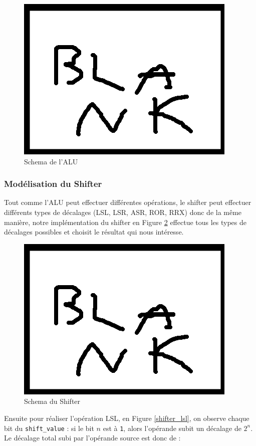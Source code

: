 \documentclass{article}
\begin{document}
\begin{figure}[ht]
\includegraphics[scale=1]{pics/blank.png}
\centering
\caption{Schema de l'ALU}
\label{alu}
\end{figure}

\subsubsection{Modélisation du Shifter}

Tout comme l'ALU peut effectuer différentes opérations, le shifter peut effectuer différents
types de décalages (LSL, LSR, ASR, ROR, RRX) donc de la même manière, notre implémentation
du shifter en Figure \ref{shifter} effectue tous les types de décalages possibles et choisit
le résultat qui nous intéresse.

\begin{figure}[H]
\includegraphics[scale=1]{pics/blank.png}
\centering
\caption{Schema du Shifter}
\label{shifter}
\end{figure}

Ensuite pour réaliser l'opération LSL, en Figure \ref{shifter_lsl},
on observe chaque bit du \texttt{shift\_value} :
si le bit $n$ est à \texttt{1}, alors l'opérande subit un décalage de $2^n$.
Le décalage total subi par l'opérande source est donc de :
\end{document}
